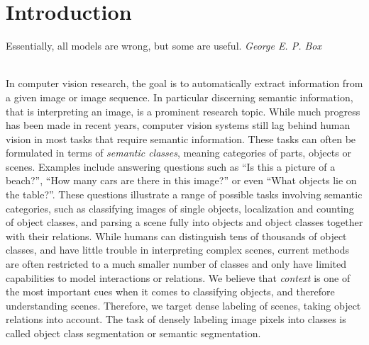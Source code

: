 \chapter{Introduction}
\vspace{1cm}
\hfill%
\begin{minipage}{.4\linewidth}
Essentially, all models are wrong, but some are useful. 
\flushright%
\emph{George E. P. Box}

\end{minipage}%
\\[2cm]
In computer vision research, the goal is to automatically extract information
from a given image or image sequence.  In particular discerning semantic
information, that is interpreting an image, is a prominent research topic.
While much progress has been made in recent years, computer vision systems still lag behind
human vision in most tasks that require semantic information. These tasks can often be formulated
in terms of \emph{semantic classes}, meaning categories of parts, objects or scenes.
Examples include answering questions such as ``Is this a picture of a beach?'', ``How many
cars are there in this image?'' or even ``What objects lie on the table?''.
These questions illustrate a range of possible tasks involving semantic categories,
such as classifying images of single objects, localization and counting of object classes,
and parsing a scene fully into objects and object classes together with their relations.
%
While humans can distinguish tens of thousands of object classes, and have
little trouble in interpreting complex scenes, current methods are often
restricted to a much smaller number of classes and only have limited
capabilities to model interactions or relations.  We believe that
\emph{context} is one of the most important cues when it comes to classifying
objects, and therefore understanding scenes. Therefore, we target dense
labeling of scenes, taking object relations into account.  The task of densely
labeling image pixels into classes is called object class segmentation or
semantic segmentation.\pagebreak\\

